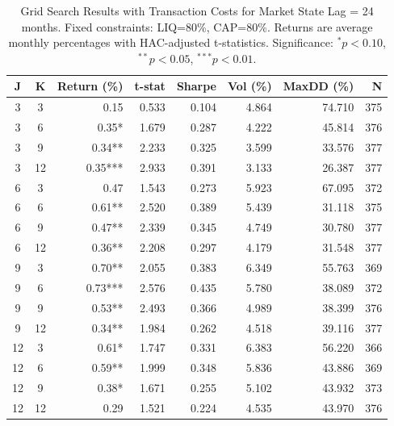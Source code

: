 \begin{table}[htbp]
\caption{Grid Search Results with Transaction Costs for Market State Lag = 24 months. Fixed constraints: LIQ=80\%, CAP=80\%. Returns are average monthly percentages with HAC-adjusted t-statistics. Significance: $^{*}p<0.10$, $^{**}p<0.05$, $^{***}p<0.01$.}
\label{tab:grid_costs_lag24}
\begin{tabular}{cc|rrrrrr}
\toprule
J & K & Return (\%) & t-stat & Sharpe & Vol (\%) & MaxDD (\%) & N \\
\midrule
3 & 3 & 0.15 & 0.533 & 0.104 & 4.864 & 74.710 & 375 \\
3 & 6 & 0.35* & 1.679 & 0.287 & 4.222 & 45.814 & 376 \\
3 & 9 & 0.34** & 2.233 & 0.325 & 3.599 & 33.576 & 377 \\
3 & 12 & 0.35*** & 2.933 & 0.391 & 3.133 & 26.387 & 377 \\
6 & 3 & 0.47 & 1.543 & 0.273 & 5.923 & 67.095 & 372 \\
6 & 6 & 0.61** & 2.520 & 0.389 & 5.439 & 31.118 & 375 \\
6 & 9 & 0.47** & 2.339 & 0.345 & 4.749 & 30.780 & 377 \\
6 & 12 & 0.36** & 2.208 & 0.297 & 4.179 & 31.548 & 377 \\
9 & 3 & 0.70** & 2.055 & 0.383 & 6.349 & 55.763 & 369 \\
9 & 6 & 0.73*** & 2.576 & 0.435 & 5.780 & 38.089 & 372 \\
9 & 9 & 0.53** & 2.493 & 0.366 & 4.989 & 38.399 & 376 \\
9 & 12 & 0.34** & 1.984 & 0.262 & 4.518 & 39.116 & 377 \\
12 & 3 & 0.61* & 1.747 & 0.331 & 6.383 & 56.220 & 366 \\
12 & 6 & 0.59** & 1.999 & 0.348 & 5.836 & 43.886 & 369 \\
12 & 9 & 0.38* & 1.671 & 0.255 & 5.102 & 43.932 & 373 \\
12 & 12 & 0.29 & 1.521 & 0.224 & 4.535 & 43.970 & 376 \\
\bottomrule
\end{tabular}
\end{table}
